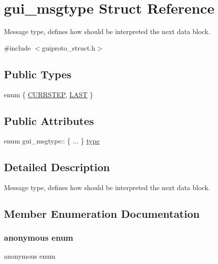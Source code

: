 \hypertarget{structgui__msgtype}{}\section{gui\+\_\+msgtype Struct Reference}
\label{structgui__msgtype}


Message type, defines how should be interpreted the next data block.  




{\ttfamily \#include $<$guiproto\+\_\+struct.\+h$>$}

\subsection*{Public Types}
\begin{DoxyCompactItemize}
\item 
enum \{ \mbox{\hyperlink{structgui__msgtype_a656b49196bb7a97a45652e57834ddf98a60a3471213f446faa50c95bfd3de7c04}{C\+U\+R\+R\+S\+T\+EP}}, 
\mbox{\hyperlink{structgui__msgtype_a656b49196bb7a97a45652e57834ddf98ae77956dbc7d53c2c94a6d4c56d5f8fe4}{L\+A\+ST}}
 \}
\end{DoxyCompactItemize}
\subsection*{Public Attributes}
\begin{DoxyCompactItemize}
\item 
enum gui\+\_\+msgtype\+:: \{ ... \}  \mbox{\hyperlink{structgui__msgtype_aa87bf17e4e06ec3af18397f32216b154}{type}}
\end{DoxyCompactItemize}


\subsection{Detailed Description}
Message type, defines how should be interpreted the next data block. 

\subsection{Member Enumeration Documentation}
\mbox{\label{structgui__msgtype_a656b49196bb7a97a45652e57834ddf98}} 
\subsubsection{\texorpdfstring{anonymous enum}{anonymous enum}}
{\footnotesize\ttfamily anonymous enum}

